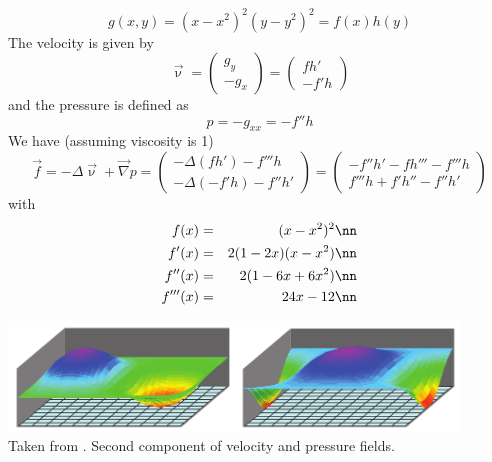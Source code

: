 \[
g(x,y)=(x-x^2)^2(y-y^2)^2 =  f(x)h(y)
\]
The velocity is given by 
\[
\vec\upnu 
= 
\left(
\begin{array}{c}
g_y \\ -g_x
\end{array}
\right)
=
\left(
\begin{array}{c}
fh' \\
-f'h
\end{array}
\right)
\]
and the pressure is defined as
\[
p
= -g_{xx}
= -f'' h
\]
We have (assuming viscosity is 1) 
\[
\vec{f} = -\Delta \vec{\upnu} + \vec\nabla p
=
\left(
\begin{array}{c}
- \Delta (fh') -f''' h  \\
-\Delta (-f'h) -f''h'
\end{array}
\right)
=
\left(
\begin{array}{c}
- f''h' - fh''' -f''' h  \\
 f'''h + f'h''  -f''h'
\end{array}
\right)
\]
with
\begin{eqnarray}
f(x)&=& (x-x^2)^2 \nn\\
f'(x) &=& 2(1-2x)(x-x^2) \nn\\
f''(x) &=& 2(1-6x+6x^2) \nn\\
f'''(x) &=& 24x-12 \nn
\end{eqnarray}


\begin{center}
\includegraphics[width=12cm]{python_codes/fieldstone_161/images/mms}\\
{\captionfont Taken from \cite{zhan09}. Second component of velocity and pressure fields.}
\end{center}


